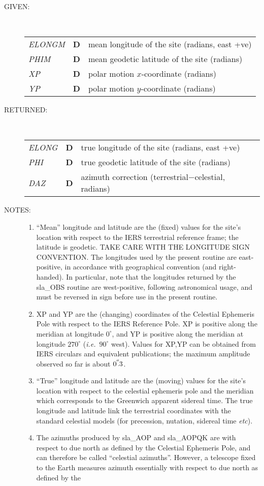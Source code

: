 \documentclass[11pt,twoside]{article}
\newcommand{\arcsec}[2] {\arcseci{#1}$\hspace{-0.4em}.#2$}
\newcommand{\arcsec}[2] {
      {$#1\hspace{-0.05em}^{'\hspace{-0.1em}'}\hspace{-0.4em}.#2$}
   }
\newcommand{\arcseci}[1] {$#1\hspace{-0.05em}$\raisebox{-0.5ex}
                         {$^{'\hspace{-0.1em}'}$}}
\renewcommand{\arcseci}[1] {$#1\hspace{-0.05em}^{'\hspace{-0.1em}'}$}
\newlength{\oldspacing}
\newcommand{\args}[2]
{
  \goodbreak
  \setlength{\oldspacing}{\topsep}
  \setlength{\topsep}{0.3ex}
  \begin{description}
  \item[#1]:\\[1.5ex]
    \begin{tabular}{p{7em}p{6em}p{22em}}
      #2
    \end{tabular}
  \end{description}
  \setlength{\topsep}{\oldspacing}
}
\renewcommand{\args}[2]
   {
     \begin{description}
        \item[#1:]\\
        \begin{tabular}{p{7em}p{6em}l}
           #2
        \end{tabular}
     \end{description}
   }
\newcommand{\spec}[3]
{
  {\em {#1}} & {\bf \mbox{#2}} & {#3}
}
\newcommand{\notes}[1]
{
  \goodbreak
  \setlength{\oldspacing}{\topsep}
  \setlength{\topsep}{0.3ex}
  \begin{description}
    \item[NOTES]:
        #1
  \end{description}
  \setlength{\topsep}{\oldspacing}
}
\renewcommand{\notes}[1]
   {
      \begin{description}
         \item[NOTES:]
            #1
      \end{description}
   }
\begin{document}
\args{GIVEN}
{
 \spec{ELONGM}{D}{mean longitude of the site (radians, east +ve)} \\
 \spec{PHIM}{D}{mean geodetic latitude of the site (radians)} \\
 \spec{XP}{D}{polar motion $x$-coordinate (radians)} \\
 \spec{YP}{D}{polar motion $y$-coordinate (radians)}
}
\args{RETURNED}
{
 \spec{ELONG}{D}{true longitude of the site (radians, east +ve)} \\
 \spec{PHI}{D}{true geodetic latitude of the site (radians)} \\
 \spec{DAZ}{D}{azimuth correction (terrestrial$-$celestial, radians)}
}
\notes
{
\begin{enumerate}
\item ``Mean'' longitude and latitude are the (fixed) values for the
      site's location with respect to the IERS terrestrial reference
      frame;  the latitude is geodetic.  TAKE CARE WITH THE LONGITUDE
      SIGN CONVENTION.  The longitudes used by the present routine
      are east-positive, in accordance with geographical convention
      (and right-handed).  In particular, note that the longitudes
      returned by the sla\_OBS routine are west-positive, following
      astronomical usage, and must be reversed in sign before use in
      the present routine.
\item XP and YP are the (changing) coordinates of the Celestial
      Ephemeris Pole with respect to the IERS Reference Pole.
      XP is positive along the meridian at longitude $0^\circ$,
      and YP is positive along the meridian at longitude
      $270^\circ$ ({\it i.e.}\ $90^\circ$ west).  Values for XP,YP can
      be obtained from IERS circulars and equivalent publications;
      the maximum amplitude observed so far is about \arcsec{0}{3}.
\item ``True'' longitude and latitude are the (moving) values for
      the site's location with respect to the celestial ephemeris
      pole and the meridian which corresponds to the Greenwich
      apparent sidereal time.  The true longitude and latitude
      link the terrestrial coordinates with the standard celestial
      models (for precession, nutation, sidereal time {\it etc}).
\item The azimuths produced by sla\_AOP and sla\_AOPQK are with
      respect to due north as defined by the Celestial Ephemeris
      Pole, and can therefore be called ``celestial azimuths''.
      However, a telescope fixed to the Earth measures azimuth
      essentially with respect to due north as defined by the

\end{enumerate}}
\end{document}
